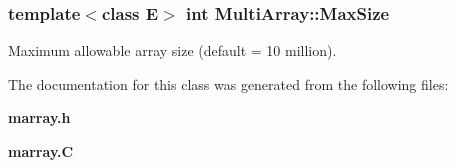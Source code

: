 \subsubsection{\setlength{\rightskip}{0pt plus 5cm}template$<$class E$>$ int Multi\-Array::Max\-Size}\label{classMultiArray_m0}


Maximum allowable array size (default = 10 million).



The documentation for this class was generated from the following files:\begin{CompactItemize}
\item 
{\bf marray.h}\item 
{\bf marray.C}\end{CompactItemize}
